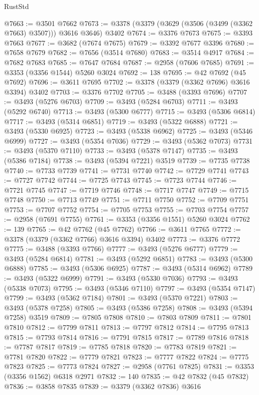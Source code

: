 \begin{lexlean}{RustStd}
\begin{coremodule}
@7663 := @3501 @7662
@7673 := @3378 (@3379 (@3629 (@3506 (@3499 (@3362 @7663) @3507))) @3616 @3646) @3402
@7674 := @3376 @7673
@7675 := @3393 @7663
@7677 := @3682 (@7674 @7675)
@7679 := @3392 @7677 @3396
@7680 := @7658 @7679
@7682 := @7656 (@3514 @7680)
@7683 := @3514 @4917
@7684 := @7682 @7683
@7685 := @7647 @7684
@7687 := @2958 (@7606 @7685)
@7691 := @3353 (@3356 @1544) @5260 @3024
@7692 := 138
@7695 := @42 @7692 (@45 @7692)
@7696 := @3611 @7695
@7702 := @3378 (@3379 (@3362 @7696) @3616 @3394) @3402
@7703 := @3376 @7702
@7705 := @3488 (@3393 @7696)
@7707 := @3493 (@5276 @6703)
@7709 := @3493 (@5284 @6703)
@7711 := @3493 (@5292 @6740)
@7713 := @3493 (@5300 @6777)
@7715 := @3493 (@5306 @6814)
@7717 := @3493 (@5314 @6851)
@7719 := @3493 (@5322 @6888)
@7721 := @3493 (@5330 @6925)
@7723 := @3493 (@5338 @6962)
@7725 := @3493 (@5346 @6999)
@7727 := @3493 (@5354 @7036)
@7729 := @3493 (@5362 @7073)
@7731 := @3493 (@5370 @7110)
@7733 := @3493 (@5378 @7147)
@7735 := @3493 (@5386 @7184)
@7738 := @3493 (@5394 @7221) @3519
@7739 := @7735 @7738
@7740 := @7733 @7739
@7741 := @7731 @7740
@7742 := @7729 @7741
@7743 := @7727 @7742
@7744 := @7725 @7743
@7745 := @7723 @7744
@7746 := @7721 @7745
@7747 := @7719 @7746
@7748 := @7717 @7747
@7749 := @7715 @7748
@7750 := @7713 @7749
@7751 := @7711 @7750
@7752 := @7709 @7751
@7753 := @7707 @7752
@7754 := @7705 @7753
@7755 := @7703 @7754
@7757 := @2958 (@7691 @7755)
@7761 := @3353 (@3356 @1551) @5260 @3024
@7762 := 139
@7765 := @42 @7762 (@45 @7762)
@7766 := @3611 @7765
@7772 := @3378 (@3379 (@3362 @7766) @3616 @3394) @3402
@7773 := @3376 @7772
@7775 := @3488 (@3393 @7766)
@7777 := @3493 (@5276 @6777)
@7779 := @3493 (@5284 @6814)
@7781 := @3493 (@5292 @6851)
@7783 := @3493 (@5300 @6888)
@7785 := @3493 (@5306 @6925)
@7787 := @3493 (@5314 @6962)
@7789 := @3493 (@5322 @6999)
@7791 := @3493 (@5330 @7036)
@7793 := @3493 (@5338 @7073)
@7795 := @3493 (@5346 @7110)
@7797 := @3493 (@5354 @7147)
@7799 := @3493 (@5362 @7184)
@7801 := @3493 (@5370 @7221)
@7803 := @3493 (@5378 @7258)
@7805 := @3493 (@5386 @7258)
@7808 := @3493 (@5394 @7258) @3519
@7809 := @7805 @7808
@7810 := @7803 @7809
@7811 := @7801 @7810
@7812 := @7799 @7811
@7813 := @7797 @7812
@7814 := @7795 @7813
@7815 := @7793 @7814
@7816 := @7791 @7815
@7817 := @7789 @7816
@7818 := @7787 @7817
@7819 := @7785 @7818
@7820 := @7783 @7819
@7821 := @7781 @7820
@7822 := @7779 @7821
@7823 := @7777 @7822
@7824 := @7775 @7823
@7825 := @7773 @7824
@7827 := @2958 (@7761 @7825)
@7831 := @3353 (@3356 @1562) @6318 @2971
@7832 := 140
@7835 := @42 @7832 (@45 @7832)
@7836 := @3858 @7835
@7839 := @3379 (@3362 @7836) @3616

\end{coremodule}
\end{lexlean}
